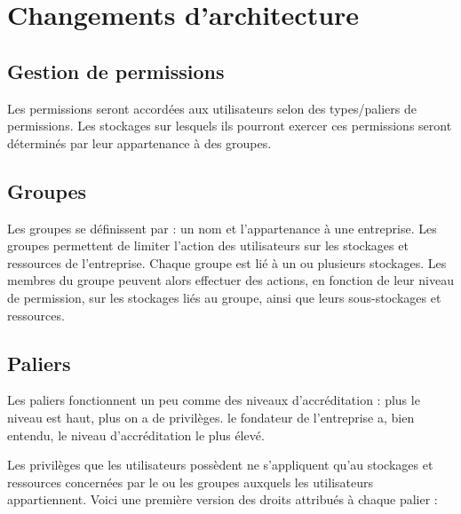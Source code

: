 \documentclass[a4paper, 12pt]{report}
\begin{document}
			
			

	\chapter{Changements d'architecture}
		\section{Gestion de permissions}
			Les permissions seront accordées aux utilisateurs selon des types/paliers de permissions. 
			Les stockages sur lesquels ils pourront exercer ces permissions seront déterminés par leur appartenance à des groupes.

		\section{Groupes}
			Les groupes se définissent par : un nom et l’appartenance à une entreprise. Les groupes permettent de limiter l’action des utilisateurs sur les stockages et ressources de l’entreprise. Chaque groupe est lié à un ou plusieurs stockages. Les membres du groupe peuvent alors effectuer des actions, en fonction de leur niveau de permission, sur les stockages liés au groupe, ainsi que leurs sous-stockages et ressources.

		\section{Paliers}
			Les paliers fonctionnent un peu comme des niveaux d'accréditation : plus le niveau est haut, plus on a de privilèges. le fondateur de l’entreprise a, bien entendu, le niveau d’accréditation le plus élevé.

			Les privilèges que les utilisateurs possèdent ne s’appliquent qu’au stockages et ressources concernées par le ou les groupes auxquels les utilisateurs appartiennent.
			Voici une première version des droits attribués à chaque palier :
\end{document}
